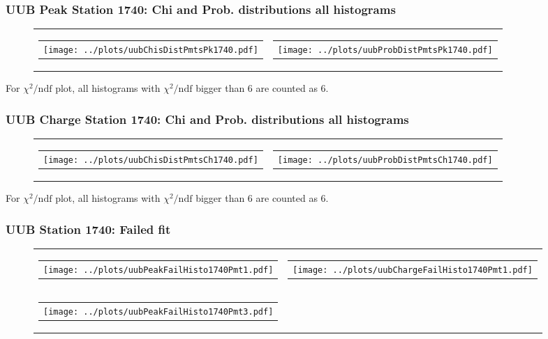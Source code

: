 \documentclass[aspectratio=169]{beamer}
\begin{document}

\begin{frame}
  \frametitle{UUB Peak Station 1740: Chi and Prob. distributions all histograms}
  \begin{figure}
    \centering
    \begin{tabularx}{\textwidth}{CC}
      \begin{tabular}{l}
        \texttt{[image: ../plots/uubChisDistPmtsPk1740.pdf]}
      \end{tabular}
      &
      \begin{tabular}{l}
        \texttt{[image: ../plots/uubProbDistPmtsPk1740.pdf]}
      \end{tabular}
    \end{tabularx}
  \end{figure}
  For $\chi^2 / \mathrm{ndf}$ plot, all histograms with $\chi^2 / \mathrm{ndf}$ 
  bigger than 6 are counted as 6.
\end{frame}


\begin{frame}
  \frametitle{UUB Charge Station 1740: Chi and Prob. distributions all histograms}
  \begin{figure}
    \centering
    \begin{tabularx}{\textwidth}{CC}
      \begin{tabular}{l}
        \texttt{[image: ../plots/uubChisDistPmtsCh1740.pdf]}
      \end{tabular}
      &
      \begin{tabular}{l}
        \texttt{[image: ../plots/uubProbDistPmtsCh1740.pdf]}
      \end{tabular}
    \end{tabularx}
  \end{figure}
  For $\chi^2 / \mathrm{ndf}$ plot, all histograms with $\chi^2 / \mathrm{ndf}$ 
  bigger than 6 are counted as 6.
\end{frame}


\begin{frame}
  \frametitle{UUB Station 1740: Failed fit}
  \begin{figure}
    \centering
    \begin{tabularx}{\textwidth}{CC}
      \begin{tabular}{l}
        \texttt{[image: ../plots/uubPeakFailHisto1740Pmt1.pdf]}
      \end{tabular}
      &
      \begin{tabular}{l}
        \texttt{[image: ../plots/uubChargeFailHisto1740Pmt1.pdf]}
      \end{tabular}
      \\
      \begin{tabular}{l}
        \texttt{[image: ../plots/uubPeakFailHisto1740Pmt3.pdf]}
      \end{tabular}
    \end{tabularx}
  \end{figure}
\end{frame}
\end{document}
